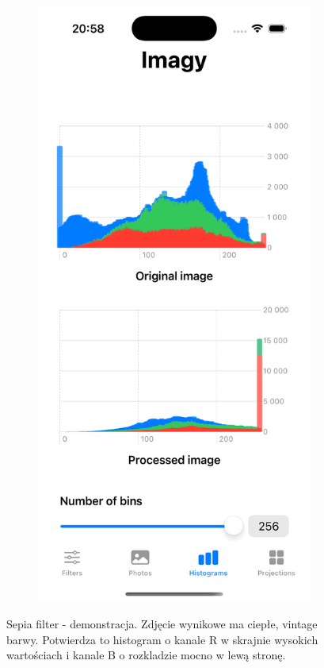 \documentclass[a4paper]{article}
\begin{document}
\begin{figure}[H]
\begin{subfigure}{0.2\textwidth}
        \label{fig:trees_sepia}
    \end{subfigure}
    \begin{subfigure}{0.2\textwidth}
        \centering
        \includegraphics[width=\linewidth]{images/trees_sepia_hisogram.png}
        \label{fig:trees_sepia_hisogram}
    \end{subfigure}
    \caption{Sepia filter - demonstracja. Zdjęcie wynikowe ma ciepłe, vintage barwy. Potwierdza to histogram o kanale R w skrajnie wysokich wartościach i kanale B o rozkladzie mocno w lewą stronę.}
    \label{fig:sepia}
\end{figure}
\end{document}
